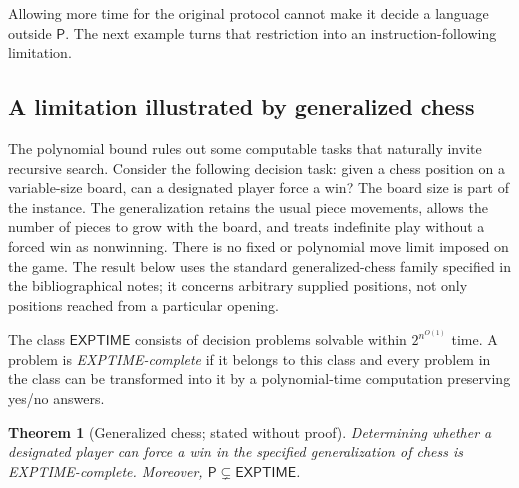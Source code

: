 \documentclass[11pt,twoside]{article}
\newtheorem{theorem}{Theorem}[section]
\theoremstyle{definition}
\theoremstyle{remark}
\begin{document}
Allowing more time for the original protocol cannot make it decide a
language outside $\mathsf P$. The next example turns that restriction into
an instruction-following limitation.

\subsection{A limitation illustrated by generalized chess}

The polynomial bound rules out some computable tasks that naturally invite
recursive search. Consider the following decision task: given a chess
position on a variable-size board, can a designated player force a win?
The board size is part of the instance. The generalization retains the
usual piece movements, allows the number of pieces to grow with the board,
and treats indefinite play without a forced win as nonwinning. There is no
fixed or polynomial move limit imposed on the game. The result below uses
the standard generalized-chess family specified in the bibliographical
notes; it concerns arbitrary supplied positions, not only positions reached
from a particular opening.

The class $\mathsf{EXPTIME}$ consists of decision problems solvable within
$2^{n^{O(1)}}$ time. A problem is \emph{EXPTIME-complete} if it belongs to
this class and every problem in the class can be transformed into it by a
polynomial-time computation preserving yes/no answers.

\begin{theorem}[Generalized chess; stated without proof]
\label{thm:chess}
Determining whether a designated player can force a win in the specified
generalization of chess is EXPTIME-complete. Moreover,
$\mathsf P\subsetneq\mathsf{EXPTIME}$.
\end{theorem}
\end{document}
